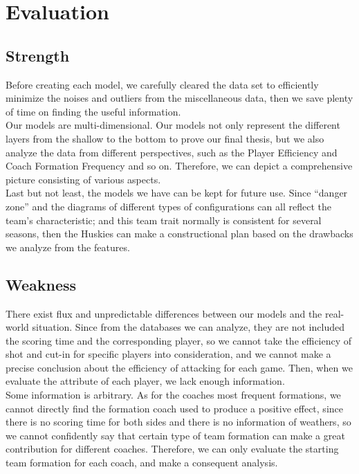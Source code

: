\documentclass[12pt]{article}
\begin{document}
\section{Evaluation}
\subsection{Strength}
Before creating each model, we carefully cleared the data set to efficiently minimize the noises and outliers from the miscellaneous data, then we save plenty of time on finding the useful information. \\
\newline
Our models are multi-dimensional. Our models not only represent the different layers from the shallow to the bottom to prove our final thesis, but we also analyze the data from different perspectives, such as the Player Efficiency and Coach Formation Frequency and so on. Therefore, we can depict a comprehensive picture consisting of various aspects. \\
\newline
Last but not least, the models we have can be kept for future use. Since “danger zone” and the diagrams of different types of configurations can all reflect the team’s characteristic; and this team trait normally is consistent for several seasons, then the Huskies can make a constructional plan based on the drawbacks we analyze from the features. 
\subsection{Weakness}
There exist flux and unpredictable differences between our models and the real-world situation. Since from the databases we can analyze, they are not included the scoring time and the corresponding player, so we cannot take the efficiency of shot and cut-in for specific players into consideration, and we cannot make a precise conclusion about the efficiency of attacking for each game. Then, when we evaluate the attribute of each player, we lack enough information. \\
\newline
Some information is arbitrary. As for the coaches most frequent formations, we cannot directly find the formation coach used to produce a positive effect, since there is no scoring time for both sides and there is no information of weathers, so we cannot confidently say that certain type of team formation can make a great contribution for different coaches. Therefore, we can only evaluate the starting team formation for each coach, and make a consequent analysis. 
\end{document}
